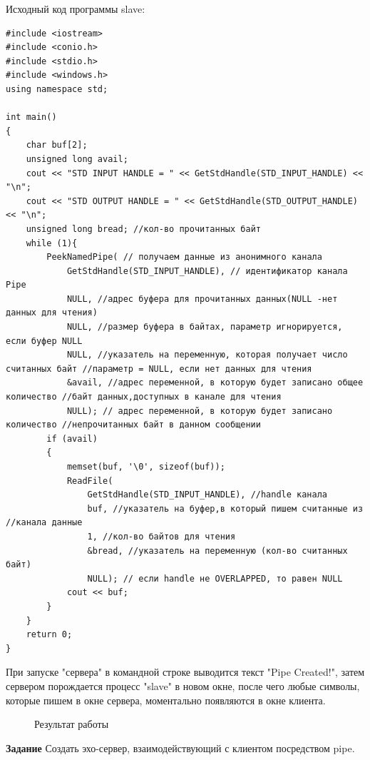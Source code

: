 \documentclass[a4paper]{article}
\begin{document}
	
	Исходный код программы slave:
	\begin{lstlisting}[style=crs_cpp]
#include <iostream>
#include <conio.h>
#include <stdio.h>
#include <windows.h>
using namespace std;

int main()
{
	char buf[2];
	unsigned long avail;
	cout << "STD INPUT HANDLE = " << GetStdHandle(STD_INPUT_HANDLE) << "\n";
	cout << "STD OUTPUT HANDLE = " << GetStdHandle(STD_OUTPUT_HANDLE) << "\n";
	unsigned long bread; //кол-во прочитанных байт
	while (1){
		PeekNamedPipe( // получаем данные из анонимного канала
			GetStdHandle(STD_INPUT_HANDLE), // идентификатор канала Pipe
			NULL, //адрес буфера для прочитанных данных(NULL -нет данных для чтения)
			NULL, //размер буфера в байтах, параметр игнорируется, если буфер NULL
			NULL, //указатель на переменную, которая получает число считанных байт //параметр = NULL, если нет данных для чтения
			&avail, //адрес переменной, в которую будет записано общее количество //байт данных,доступных в канале для чтения
			NULL); // адрес переменной, в которую будет записано количество //непрочитанных байт в данном сообщении
		if (avail)
		{
			memset(buf, '\0', sizeof(buf));
			ReadFile(
				GetStdHandle(STD_INPUT_HANDLE), //handle канала
				buf, //указатель на буфер,в который пишем считанные из //канала данные
				1, //кол-во байтов для чтения
				&bread, //указатель на переменную (кол-во считанных байт)
				NULL); // если handle не OVERLAPPED, то равен NULL
			cout << buf;
		}
	}
	return 0;
}
	\end{lstlisting}
	
	При запуске "сервера" в командной строке выводится текст "Pipe Created!", затем сервером порождается процесс "slave" в новом окне, после чего любые символы, которые пишем в окне сервера, моментально появляются в окне клиента.
	\begin{figure}[h!]
		\caption{Результат работы}
		\label{img:task1}
	\end{figure}
	
	\textbf{Задание} Создать эхо-сервер, взаимодействующий с клиентом посредством pipe.
	
\end{document}
